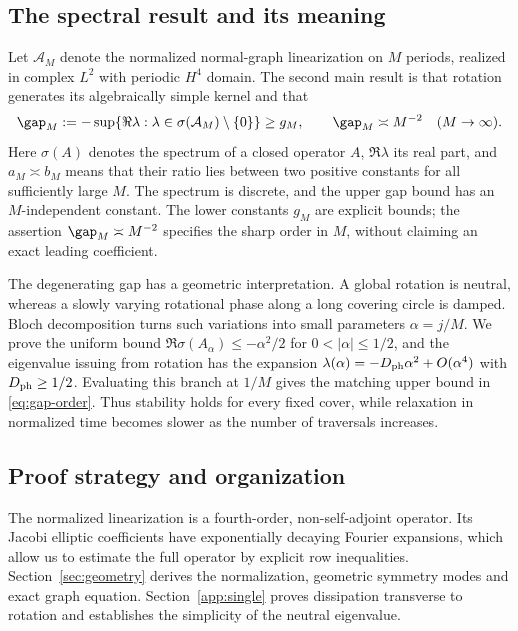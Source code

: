 \subsection{The spectral result and its meaning}
Let $\mathcal A_M$ denote the normalized normal-graph linearization on $M$ periods, realized in complex $L^2$ with periodic $H^4$ domain. The second main result is that rotation generates its algebraically simple kernel and that
\begin{equation}\label{eq:gap-order}
 \gap_M:=-\sup\{\Re\lambda:\lambda\in\sigma(\mathcal A_M)\setminus\{0\}\}
 \ge g_M,\qquad \gap_M\asymp M^{-2}\quad(M\to\infty).
\end{equation}
Here $\sigma(A)$ denotes the spectrum of a closed operator $A$, $\Re\lambda$ its real part, and $a_M\asymp b_M$ means that their ratio lies between two positive constants for all sufficiently large $M$. The spectrum is discrete, and the upper gap bound has an $M$-independent constant. The lower constants $g_M$ are explicit bounds; the assertion $\gap_M\asymp M^{-2}$ specifies the sharp order in $M$, without claiming an exact leading coefficient.

The degenerating gap has a geometric interpretation. A global rotation is neutral, whereas a slowly varying rotational phase along a long covering circle is damped. Bloch decomposition turns such variations into small parameters $\alpha=j/M$. We prove the uniform bound $\Re\sigma(A_\alpha)\le-\alpha^2/2$ for $0<|\alpha|\le1/2$, and the eigenvalue issuing from rotation has the expansion $\lambda(\alpha)=-D_{\rm ph}\alpha^2+O(\alpha^4)$ with $D_{\rm ph}\ge1/2$. Evaluating this branch at $1/M$ gives the matching upper bound in \eqref{eq:gap-order}. Thus stability holds for every fixed cover, while relaxation in normalized time becomes slower as the number of traversals increases.

\subsection{Proof strategy and organization}
The normalized linearization is a fourth-order, non-self-adjoint operator. Its Jacobi elliptic coefficients have exponentially decaying Fourier expansions, which allow us to estimate the full operator by explicit row inequalities. Section~\ref{sec:geometry} derives the normalization, geometric symmetry modes and exact graph equation. Section~\ref{app:single} proves dissipation transverse to rotation and establishes the simplicity of the neutral eigenvalue.

